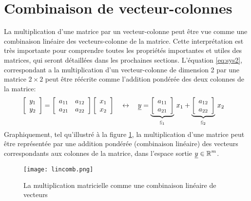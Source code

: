 \section{Combinaison de vecteur-colonnes}
\label{sec:combveccol}

La multiplication d'une matrice par un vecteur-colonne peut être vue comme une combinaison linéaire des vecteurs-colonne de la matrice. Cette interprétation est très importante pour comprendre toutes les propriétés importantes et utiles des matrices, qui seront détaillées dans les prochaines sections. L’équation \eqref{eq:sys2}, correspondant a la multiplication d'un vecteur-colonne de dimension 2 par une matrice $2\times2$ peut être réécrite comme l'addition pondérée des deux colonnes de la matrice:
%
\begin{align}
	\left[ \begin{array}{c}
			   y_1 \\ y_2
	\end{array} \right] &=
	\left[ \begin{array}{c c}
			   a_{11} & a_{12} \\ a_{21} & a_{22}
	\end{array} \right]
	\left[ \begin{array}{c}
			   x_1 \\ x_2
	\end{array} \right] \quad \leftrightarrow \quad  \col{y}  =
%
	\underbrace{\left[ \begin{array}{c}
						   a_{11} \\ a_{21}
	\end{array} \right]}_{\col{c}_1} \, x_1 +
	\underbrace{\left[ \begin{array}{c}
						   a_{12} \\ a_{22}
	\end{array} \right]}_{\col{c}_2} \, x_2
	\label{eq:sys2-col}
\end{align}
%
Graphiquement, tel qu'illustré à la figure \ref{fig:lincomb}, la multiplication d'une matrice peut être représentée par une addition pondérée (combinaison linéaire) des vecteurs correspondants aux colonnes de la matrice, dans l'espace sortie $\underline{y} \in \operatorname{\mathbb{R}}^m$.

\begin{figure}[H]
	\centering
	\texttt{[image: lincomb.png]}
	\caption{La multiplication matricielle comme une combinaison linéaire de vecteurs}
	\label{fig:lincomb}
\end{figure}

